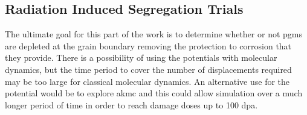 \subsection{Radiation Induced Segregation Trials}

The ultimate goal for this part of the work is to determine whether or not \acrshort{pgm}s are depleted at the grain boundary removing the protection to corrosion that they provide.  There is a possibility of using the potentials with molecular dynamics, but the time period to cover the number of displacements required may be too large for classical molecular dynamics.  An alternative use for the potential would be to explore \acrfull{akmc} and this could allow simulation over a much longer period of time in order to reach damage doses up to 100 \acrshort{dpa}.




